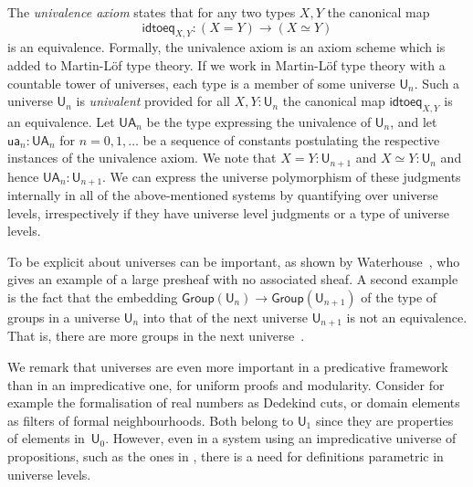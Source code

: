 \documentclass[11pt,a4paper]{article}
\theoremstyle{definition}
\newcommand{\UU}{\mathsf{U}}
\newcommand{\Level}{\mathsf{level}}
\newcommand{\Group}{\mathsf{Group}}
\newcommand{\idtoeq}{\mathsf{idtoeq}}
\newcommand{\ua}{\mathsf{ua}}
\newcommand{\UA}{\mathsf{UA}}
\begin{document}
The \emph{univalence axiom} states that for any two types $X,Y$ the canonical map
$$
\idtoeq_{X,Y} : (X=Y)\to (X\simeq Y)
$$
is an equivalence.
Formally, the univalence axiom is an axiom scheme which is added to
Martin-Löf type theory.
If we work in Martin-Löf type theory with a countable tower of universes,
each type is a member of some universe $\UU_n$.
Such a universe $\UU_n$ is {\em univalent} provided for all $X,Y : \UU_n$ the
canonical map $\idtoeq_{X,Y}$ is an equivalence.
Let $\UA_n$ be the type expressing the univalence of $\UU_n$, and let
$\ua_n : \UA_n$ for $n = 0,1,\ldots$ be a sequence of constants postulating
the respective instances of the univalence axiom.
We note that $X = Y : \UU_{n+1}$ and $X\simeq Y : \UU_n$ and
hence $\UA_n : \UU_{n+1}$. We can express the universe polymorphism of these judgments internally in all of the above-mentioned systems by quantifying over universe levels, irrespectively if they have universe level judgments or a type of universe levels.

To be explicit about universes can be important, as shown by Waterhouse~\cite{waterhouse:sheaves,chambert-loir:universes-matter}, who gives an example of a large presheaf with no associated sheaf. A second example is the fact that the embedding
 $\Group(\UU_n)\rightarrow \Group(\UU_{n+1})$ of the type of groups in a universe $\UU_n$ into that of the next universe $\UU_{n+1}$ is not an equivalence. That is, there are more groups in the next universe~\cite{bcde:largegroup}.

 We remark that universes are even more important in a predicative framework
than in an impredicative one, for uniform proofs and modularity.
Consider for example the formalisation of real numbers as Dedekind cuts,
or domain elements as filters of formal neighbourhoods. Both belong to $\UU_1$ since they are properties of elements in~$\UU_0$.
However, even in a system using an impredicative universe of propositions,
such as the ones in \cite{Huet87,moura:lean}, there is a need for
definitions parametric in universe levels.




\end{document}
